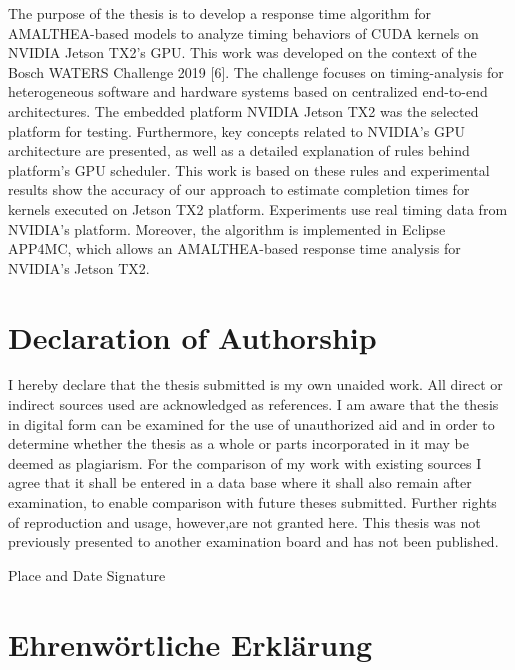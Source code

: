 \documentclass[
  12pt,
  a4paperpaper,
]{report}
\begin{document}
The purpose of the thesis is to develop a response time algorithm for
AMALTHEA-based models to analyze timing behaviors of CUDA kernels on
NVIDIA Jetson TX2's GPU. This work was developed on the context of the Bosch
WATERS Challenge 2019 {[}6{]}. The challenge focuses on timing-analysis for
heterogeneous software and hardware systems based on centralized end-to-end
architectures. The embedded platform NVIDIA Jetson TX2 was the selected platform for
testing. Furthermore, key concepts related to NVIDIA's GPU architecture
are presented, as well as a detailed explanation of rules behind
platform's GPU scheduler.
This work is based on these rules and experimental results show
the accuracy of our approach to estimate completion times for kernels
executed on Jetson TX2 platform. Experiments use real timing data from NVIDIA's
platform. Moreover, the algorithm is implemented in  Eclipse APP4MC, which allows an AMALTHEA-based response time analysis for NVIDIA's Jetson TX2.

\setcounter{page}{1}

\hypertarget{declaration-of-authorship}{%
\chapter*{Declaration of Authorship}\label{declaration-of-authorship}}

I hereby declare that the thesis submitted is my own unaided work. All
direct or indirect sources used are acknowledged as references. I am
aware that the thesis in digital form can be examined for the use of
unauthorized aid and in order to determine whether the thesis as a whole
or parts incorporated in it may be deemed as plagiarism. For the
comparison of my work with existing sources I agree that it shall be
entered in a data base where it shall also remain after examination, to
enable comparison with future theses submitted. Further rights of
reproduction and usage, however,are not granted here. This thesis was
not previously presented to another examination board and has not been
published.

Place and Date
\quad\quad\quad\quad\quad\quad\quad\quad\quad\quad\quad\quad\quad\quad Signature

\hypertarget{ehrenwuxf6rtliche-erkluxe4rung}{%
\chapter*{Ehrenwörtliche
Erklärung}\label{ehrenwuxf6rtliche-erkluxe4rung}}
\end{document}
